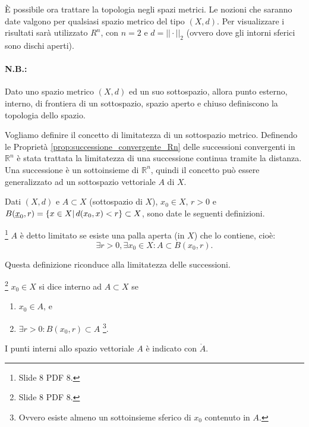 È possibile ora trattare la topologia negli spazi metrici. Le nozioni che saranno date valgono per qualsiasi spazio metrico del tipo $(X,d)$. Per visualizzare i risultati sarà utilizzato $R^n$, con $n=2$ e $d=||\cdot||_2$ (ovvero dove gli intorni sferici sono dischi aperti).

\paragraph{N.B.:} Dato uno spazio metrico $(X,d)$ ed un suo \gls{sottospazio}, allora punto esterno, interno, di frontiera di un sottospazio, spazio aperto e chiuso definiscono la topologia dello spazio.

Vogliamo definire il concetto di limitatezza di un sottospazio metrico. Definendo le Proprietà \ref{prop:successione_convergente_Rn} delle successioni convergenti in $\mathbb R^n$ è stata trattata la limitatezza di una successione continua tramite la distanza. Una successione è un sottoinsieme di $\mathbb R^n$, quindi il concetto può essere generalizzato ad un sottospazio vettoriale $A$ di $X$.

Dati $(X,d)$ e $A\subset X$ (sottospazio di $X$), $x_0\in X,\, r>0$ e $B(\uline x_0, r)=\{x\in X|\, d(x_0,x)<r\}\subset X$, sono date le seguenti definizioni.

\begin{definition} \footnote{Slide 8 PDF 8.}
    $A$ è detto limitato se esiste una palla aperta (in $X$) che lo contiene, cioè:
    \begin{equation*}
        \exists r>0,\exists x_0\in X\colon A\subset B(x_0,r).
    \end{equation*}
\end{definition}

Questa definizione riconduce alla limitatezza delle successioni.

\begin{definition}\footnote{Slide 8 PDF 8.}
    $x_0\in X$ si dice interno ad $A\subset X$ se
    \begin{enumerate}
        \item $x_0\in A$, e
        \item $\exists r>0\colon B(x_0, r)\subset A$ \footnote{Ovvero esiste almeno un sottoinsieme sferico di $x_0$ contenuto in $A$.}.
    \end{enumerate}
\end{definition}

\begin{definition}
    I punti interni allo spazio vettoriale $A$ è indicato con $\mathring A$.
\end{definition}

